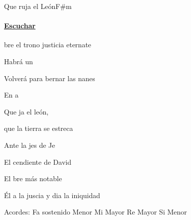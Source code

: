 \documentclass[12pt, spanish]{book}
\begin{document}
    \begin{song}{Que ruja el León}{F\#m}
    {} %
    {}
    {} %
    {}
        \ifChordBk
          \paragraph{\mbox{}\hfill\protect\href{https://open.spotify.com/intl-es/track/36WEbMbVTZULcMbAmxBNPR}{Escuchar}\mbox{}\hfill}
        \fi



        \begin{SBOpGroup}
            bre el trono  justicia eternate

            Habrá un 

             Volverá para bernar las nanes

            En a
        \end{SBOpGroup}

        \begin{SBChorus}
            Que ja el león,

            que la tierra se estreca

            Ante la jes de Je
        \end{SBChorus}

        \begin{SBOpGroup}
            El cendiente de David

            El bre más notable

            Él a la juscia y dia la iniquidad
        \end{SBOpGroup}

        \ifChordBk
        \begin{SBOpGroup}
            Acordes:\break
            \upchord{\Fsm}\qquad Fa sostenido Menor \hfill
            \upchord{\E}\qquad Mi Mayor \hfill\null\break
            \upchord{\D}\qquad Re Mayor \hfill
            \upchord{\Bm}\qquad Si Menor \hfill\null\break
        \end{SBOpGroup}
        \fi
    \end{song}
\end{document}
